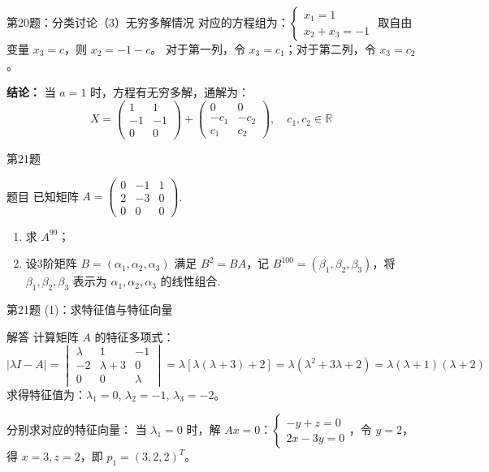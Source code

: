 \documentclass[aspectratio=169]{beamer}
\begin{document}
\begin{frame}{第20题：分类讨论（3）无穷多解情况}
对应的方程组为：\(\begin{cases} x_1 = 1 \\ x_2 + x_3 = -1 \end{cases}\)
取自由变量 \(x_3 = c\)，则 \(x_2 = -1 - c\)。
对于第一列，令 \(x_3 = c_1\)；对于第二列，令 \(x_3 = c_2\)。

\textbf{结论：} 当 \(a=1\) 时，方程有无穷多解，通解为：
\[
X=\begin{pmatrix}1 & 1\\ -1 & -1\\ 0 & 0\end{pmatrix}+\begin{pmatrix}0 & 0\\ -c_1 & -c_2\\ c_1 & c_2\end{pmatrix},\quad c_1,c_2\in\mathbb{R}
\]
\end{frame}
\begin{frame}{第21题}
\begin{block}{题目}
已知矩阵 \(A=\begin{pmatrix}0 & -1 & 1 \\ 2 & -3 & 0 \\ 0 & 0 & 0\end{pmatrix}\).
\begin{enumerate}[(1)]
\item 求 \(A^{99}\)；
\item 设3阶矩阵 \(B=(\alpha_1,\alpha_2,\alpha_3)\) 满足 \(B^2=BA\)，记 \(B^{100}=(\beta_1,\beta_2,\beta_3)\)，将 \(\beta_1,\beta_2,\beta_3\) 表示为 \(\alpha_1,\alpha_2,\alpha_3\) 的线性组合.
\end{enumerate}
\end{block}
\end{frame}

\begin{frame}{第21题 (1)：求特征值与特征向量}
\begin{block}{解答}
计算矩阵 \(A\) 的特征多项式：
\[
|\lambda I - A| = \begin{vmatrix} \lambda & 1 & -1 \\ -2 & \lambda+3 & 0 \\ 0 & 0 & \lambda \end{vmatrix} = \lambda [\lambda(\lambda+3) + 2] = \lambda(\lambda^2 + 3\lambda + 2) = \lambda(\lambda+1)(\lambda+2)
\]
求得特征值为：\(\lambda_1 = 0\), \(\lambda_2 = -1\), \(\lambda_3 = -2\)。

分别求对应的特征向量：
当 \(\lambda_1 = 0\) 时，解 \(Ax=0\)：\(\begin{cases} -y+z=0 \\ 2x-3y=0 \end{cases}\)，令 \(y=2\)，得 \(x=3, z=2\)，即 \(p_1 = (3,2,2)^T\)。
\end{block}
\end{frame}
\end{document}
